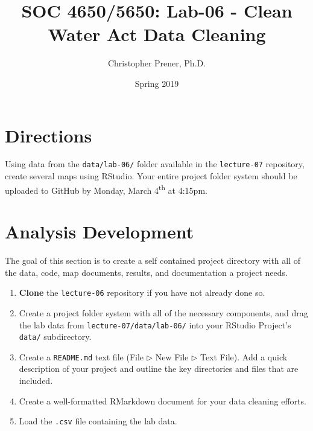 \documentclass{tufte-handout}
\title{SOC 4650/5650: Lab-06 - Clean Water Act Data Cleaning}
\author{Christopher Prener, Ph.D.}
\date{Spring 2019}
\begin{document}
\maketitle %

\section{Directions}
Using data from the \texttt{data/lab-06/} folder available in the \texttt{lecture-07} repository, create several maps using RStudio. Your entire project folder system should be uploaded to GitHub by Monday, March 4\textsuperscript{th} at 4:15pm.

\vspace{5mm}
\section{Analysis Development}
The goal of this section is to create a self contained project directory with all of the data, code, map documents, results, and documentation a project needs.

\begin{enumerate}[label=\alph*.]
\item \textbf{Clone} the \texttt{lecture-06} repository if you have not already done so.
\item Create a project folder system with all of the necessary components, and drag the lab data from \texttt{lecture-07/data/lab-06/} into your RStudio Project's \texttt{data/} subdirectory.
\item Create a \texttt{README.md} text file (\textsf{File $\triangleright$} {\color{red}\textsf{New File}} \textsf{$\triangleright$ Text File}). Add a quick description of your project and outline the key directories and files that are included. 
\item Create a well-formatted RMarkdown document for your data cleaning efforts.
\item Load the \texttt{.csv} file containing the lab data.
\end{enumerate}

\vspace{5mm}
\end{document}
